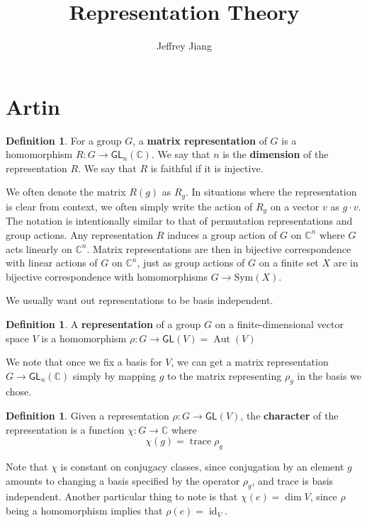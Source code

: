 \documentclass[psamsfonts]{amsart}
\theoremstyle{definition}
\newtheorem{defn}[thm]{Definition}
\theoremstyle{remark}
\newcommand{\C}{\mathbb{C}}
\newcommand{\GL}{\mathsf{GL}}
\DeclareMathOperator{\id}{id}
\DeclareMathOperator{\Aut}{Aut}
\DeclareMathOperator{\trace}{trace}
\begin{document}
\author{Jeffrey Jiang}
\title{Representation Theory}
\maketitle

\section{Artin}
\begin{defn}
For a group $G$, a \textbf{matrix representation} of $G$ is a homomorphism $R: G\to \GL_n(\C)$. We say that $n$ is the \textbf{dimension} of the representation $R$. We say that $R$ is faithful if it is injective.
\end{defn}

We often denote the matrix $R(g)$ as $R_g$. In situations where the representation is clear from context, we often simply write the action of $R_g$ on a vector $v$ as $g \cdot v$. The notation is intentionally similar to that of permutation representations and group actions. Any representation $R$ induces a group action of $G$ on $\C^n$ where $G$ acts linearly on $\C^n$. Matrix representations are then in bijective correspondence with linear actions of $G$ on $\C^n$, just as group actions of $G$ on a finite set $X$ are in bijective correspondence with homomorphisms $G \to \text{Sym}(X)$.

We usually want out representations to be basis independent.
\begin{defn}
A \textbf{representation} of a group $G$ on a finite-dimensional vector space $V$ is a homomorphism $\rho: G \to \GL(V) = \Aut(V)$
\end{defn}
We note that once we fix a basis for $V$, we can get a matrix representation $G \to \GL_n(\C)$ simply by mapping $g$ to the matrix representing $\rho_g$ in the basis we chose.

\begin{defn}
Given a representation $\rho: G \to \GL(V)$, the \textbf{character} of the representation is a function $\chi: G \to \C$ where 
$$\chi(g) = \trace \rho_g $$
\end{defn}

Note that $\chi$ is constant on conjugacy classes, since conjugation by an element $g$ amounts to changing a basis specified by the operator $\rho_g$, and trace is basis independent. Another particular thing to note is that $\chi(e) = \dim V$, since $\rho$ being a homomorphism implies that $\rho(e) = \id_V$.
\end{document}
